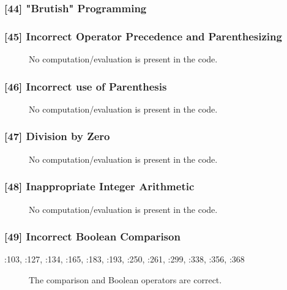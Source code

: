 \subsubsection{[44] "Brutish" Programming}
\begin{description}
	\item[] %
\end{description}
\subsubsection{[45] Incorrect Operator Precedence and Parenthesizing}
\begin{description}
	\item[] No computation/evaluation is present in the code.
\end{description}
\subsubsection{[46] Incorrect use of Parenthesis}
\begin{description}
	\item[] No computation/evaluation is present in the code.
\end{description}
\subsubsection{[47] Division by Zero}
\begin{description}
	\item[] No computation/evaluation is present in the code.
\end{description}
\subsubsection{[48] Inappropriate Integer Arithmetic}
\begin{description}
	\item[] No computation/evaluation is present in the code.
\end{description}
\subsubsection{[49] Incorrect Boolean Comparison}
\begin{description}
	\item[:103, :127, :134, :165, :183, :193, :250, :261, :299, :338, :356, :368 ] The comparison and Boolean operators are correct.
\end{description}
